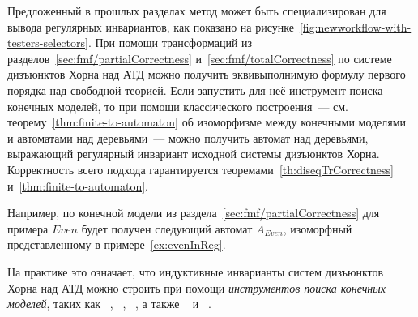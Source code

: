 \newworkflowWithTestersAndSelectors{}

Предложенный в прошлых разделах метод может быть специализирован для вывода регулярных инвариантов, как показано на рисунке~\cref{fig:newworkflow-with-testers-selectors}.
При помощи трансформаций из разделов~\cref{sec:fmf/partialCorrectness} и~\cref{sec:fmf/totalCorrectness} по системе дизъюнктов Хорна над АТД можно получить эквивыполнимую формулу первого порядка над свободной теорией.
Если запустить для неё инструмент поиска конечных моделей, то при помощи классического построения~---
см. теорему~\ref{thm:finite-to-automaton} об изоморфизме между конечными моделями и автоматами над деревьями~--- можно получить автомат над деревьями, выражающий регулярный инвариант исходной системы дизъюнктов Хорна.
Корректность всего подхода гарантируется теоремами~\ref{th:diseqTrCorrectness} и~\ref{thm:finite-to-automaton}.

Например, по конечной модели из раздела~\cref{sec:fmf/partialCorrectness} для примера $ Even $ будет получен следующий автомат $ A _{Even} $, изоморфный представленному в примере~\ref{ex:evenInReg}.
\exampleCostruction

На практике это означает, что индуктивные инварианты систем дизъюнктов Хорна над АТД можно строить при помощи \emph{инструментов поиска конечных моделей}, таких как \mace{}~\cite{https://doi.org/10.48550/arxiv.cs/0310055}, \kodkod{}~\cite{10.1007/978-3-540-71209-1_49}, \paradox{}~\cite{claessen2003new}, а также \cvc{}~\cite{reynolds2013finite} и \vampire{}~\cite{10.1007/978-3-319-40970-2_20}.

